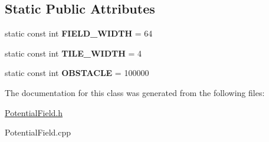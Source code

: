 \subsection*{Static Public Attributes}
\begin{DoxyCompactItemize}
\item 
\hypertarget{class_potential_field_aed1555fc2d0a42609184f54f8abd16b4}{static const int {\bfseries F\-I\-E\-L\-D\-\_\-\-W\-I\-D\-T\-H} = 64}\label{class_potential_field_aed1555fc2d0a42609184f54f8abd16b4}

\item 
\hypertarget{class_potential_field_a5bc1d7622b1682a58423d75efd0d5074}{static const int {\bfseries T\-I\-L\-E\-\_\-\-W\-I\-D\-T\-H} = 4}\label{class_potential_field_a5bc1d7622b1682a58423d75efd0d5074}

\item 
\hypertarget{class_potential_field_a28d31c5d9ef774ca765e305b16692990}{static const int {\bfseries O\-B\-S\-T\-A\-C\-L\-E} = 100000}\label{class_potential_field_a28d31c5d9ef774ca765e305b16692990}

\end{DoxyCompactItemize}


The documentation for this class was generated from the following files\-:\begin{DoxyCompactItemize}
\item 
\hyperlink{_potential_field_8h}{Potential\-Field.\-h}\item 
Potential\-Field.\-cpp\end{DoxyCompactItemize}
